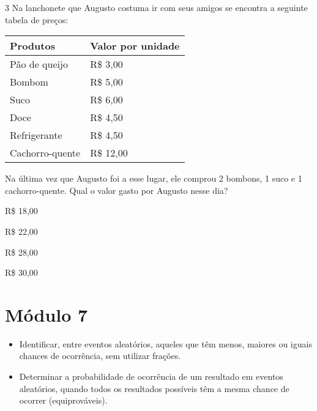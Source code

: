 
\num{3} Na lanchonete que Augusto costuma ir com seus amigos se encontra a
seguinte tabela de preços:

\begin{longtable}[]{@{}ll@{}}
\toprule
Produtos & Valor por unidade\tabularnewline
\midrule
\endhead
Pão de queijo & R\$ 3,00\tabularnewline
Bombom & R\$ 5,00\tabularnewline
Suco & R\$ 6,00\tabularnewline
Doce & R\$ 4,50\tabularnewline
Refrigerante & R\$ 4,50\tabularnewline
Cachorro-quente & R\$ 12,00\tabularnewline
\bottomrule
\end{longtable}

Na última vez que Augusto foi a esse lugar, ele comprou 2 bombons, 1
suco e 1 cachorro-quente. Qual o valor gasto por Augusto nesse dia?

\begin{escolha}
\item
  R\$ 18,00
\item
  R\$ 22,00
\item
  R\$ 28,00
\item
  R\$ 30,00
\end{escolha}


\chapter{Módulo 7}



\begin{itemize}
\item Identificar, entre eventos aleatórios, aqueles que têm menos, maiores ou
iguais chances de ocorrência, sem utilizar frações.

\item Determinar a probabilidade de ocorrência de um resultado em eventos
aleatórios, quando todos os resultados possíveis têm a mesma chance de
ocorrer (equiprováveis).
\end{itemize}

